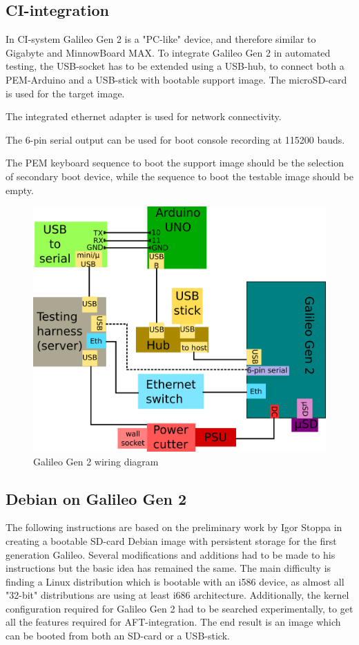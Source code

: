 \documentclass[a4paper,11pt]{article}
\begin{document}
\subsection{CI-integration}

In CI-system Galileo Gen 2 is a "PC-like" device, and therefore similar to  Gigabyte and MinnowBoard MAX. To integrate Galileo Gen 2 in automated testing, the USB-socket has to be extended using a USB-hub, to connect both a PEM-Arduino and a USB-stick with bootable support image. The microSD-card is used for the target image.

The integrated ethernet adapter is used for network connectivity.

The 6-pin serial output can be used for boot console recording at 115200 bauds.

The PEM keyboard sequence to boot the support image should be the selection of secondary boot device, while the sequence to boot the testable image should be empty.

\begin{figure}[h]
	\centering
	\includegraphics[width=0.7\linewidth]{galileogen2wiring.png}
	\caption{Galileo Gen 2 wiring diagram}
	\label{fig:galileogen2wiring}
\end{figure}

\subsection{Debian on Galileo Gen 2}

The following instructions are based on the preliminary work by Igor Stoppa in creating a bootable SD-card Debian image with persistent storage for the first generation Galileo. Several modifications and additions had to be made to his instructions but the basic idea has remained the same. The main difficulty is finding a Linux distribution which is bootable with an i586 device, as almost all "32-bit" distributions are using at least i686 architecture. Additionally, the kernel configuration required for Galileo Gen 2 had to be searched experimentally, to get all the features required for AFT-integration. The end result is an image which can be booted from both an SD-card or a USB-stick.
\end{document}
